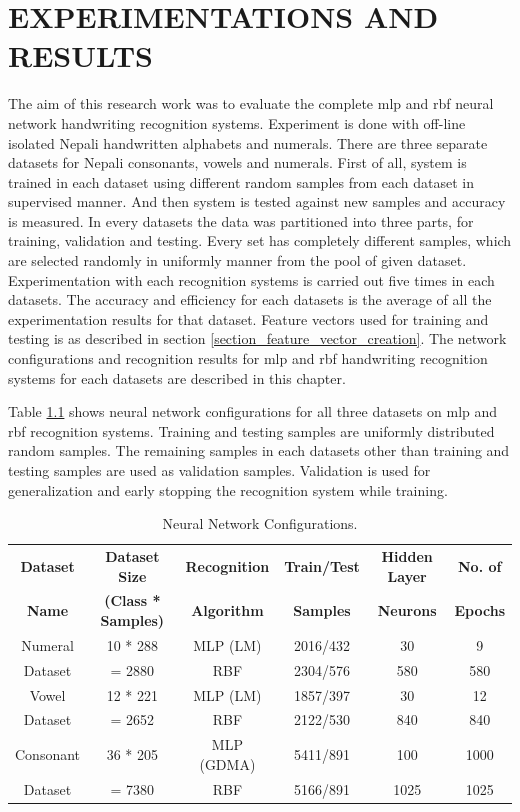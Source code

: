 \newpage
\chapter{EXPERIMENTATIONS AND RESULTS}
\label{chapter_experimentation_and_results}
The aim of this research work was to evaluate the complete \ac{mlp} and \ac{rbf} neural network handwriting recognition systems. Experiment is done with off-line isolated Nepali handwritten alphabets and numerals. There are three separate datasets for Nepali consonants, vowels and numerals. First of all, system is trained in each dataset using different random samples from each dataset in supervised manner. And then system is tested against new samples and accuracy is measured. In every datasets the data was partitioned into three parts, for training, validation and testing. Every set has completely different samples, which are selected randomly in uniformly manner from the pool of given dataset. Experimentation with each recognition systems is carried out five times in each datasets. The accuracy and efficiency for each datasets is the average of all the experimentation results for that dataset. Feature vectors used for training and testing is as described in section \ref{section_feature_vector_creation}. The network configurations and recognition results for \ac{mlp} and \ac{rbf} handwriting recognition systems for each datasets are described in this chapter.

Table \ref{table_neural_network_configurations} shows neural network configurations for all three datasets on \ac{mlp} and \ac{rbf} recognition systems. Training and testing samples are uniformly distributed random samples. The remaining samples in each datasets other than training and testing samples are used as validation samples. Validation is used for generalization and early stopping the recognition system while training.

\begin{table}[h]
\centering
\begin{tabular}{|c|c|c|c|c|c|}
\hline
\textbf{Dataset} & \textbf{Dataset Size} & \textbf{Recognition} & \textbf{Train/Test} & \textbf{Hidden Layer} & \textbf{No. of}\tabularnewline
\textbf{Name} & \textbf{(Class * Samples)} & \textbf{Algorithm} & \textbf{Samples} & \textbf{Neurons} & \textbf{Epochs}\tabularnewline
\hline
Numeral & 10 {*} 288  & MLP (LM) & 2016/432 & 30 & 9\tabularnewline
\cline{3-6}
Dataset & = 2880 & RBF & 2304/576 & 580 & 580\tabularnewline
\hline
Vowel & 12 {*} 221 & MLP (LM) & 1857/397 & 30 & 12\tabularnewline
\cline{3-6}
Dataset & = 2652 & RBF & 2122/530 & 840 & 840\tabularnewline
\hline
Consonant & 36 {*} 205 & MLP (GDMA) & 5411/891 & 100 & 1000\tabularnewline
\cline{3-6}
Dataset & = 7380 & RBF & 5166/891 & 1025 & 1025\tabularnewline
\hline
\end{tabular}
\caption{Neural Network Configurations.}
\label{table_neural_network_configurations}
\end{table}

